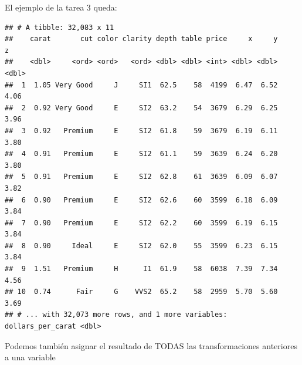 \documentclass[]{book}
\newenvironment{Shaded}{\begin{snugshade}}{\end{snugshade}}
\newcommand{\KeywordTok}[1]{\textcolor[rgb]{0.13,0.29,0.53}{\textbf{#1}}}
\newcommand{\DataTypeTok}[1]{\textcolor[rgb]{0.13,0.29,0.53}{#1}}
\newcommand{\DecValTok}[1]{\textcolor[rgb]{0.00,0.00,0.81}{#1}}
\newcommand{\StringTok}[1]{\textcolor[rgb]{0.31,0.60,0.02}{#1}}
\newcommand{\CommentTok}[1]{\textcolor[rgb]{0.56,0.35,0.01}{\textit{#1}}}
\newcommand{\OperatorTok}[1]{\textcolor[rgb]{0.81,0.36,0.00}{\textbf{#1}}}
\newcommand{\NormalTok}[1]{#1}
\theoremstyle{definition}
\theoremstyle{definition}
\theoremstyle{definition}
\theoremstyle{remark}
\begin{document}
El ejemplo de la tarea 3 queda:

\begin{Shaded}
\end{Shaded}

\begin{verbatim}
## # A tibble: 32,083 x 11
##    carat       cut color clarity depth table price     x     y     z
##    <dbl>     <ord> <ord>   <ord> <dbl> <dbl> <int> <dbl> <dbl> <dbl>
##  1  1.05 Very Good     J     SI1  62.5    58  4199  6.47  6.52  4.06
##  2  0.92 Very Good     E     SI2  63.2    54  3679  6.29  6.25  3.96
##  3  0.92   Premium     E     SI2  61.8    59  3679  6.19  6.11  3.80
##  4  0.91   Premium     E     SI2  61.1    59  3639  6.24  6.20  3.80
##  5  0.91   Premium     E     SI2  62.8    61  3639  6.09  6.07  3.82
##  6  0.90   Premium     E     SI2  62.6    60  3599  6.18  6.09  3.84
##  7  0.90   Premium     E     SI2  62.2    60  3599  6.19  6.15  3.84
##  8  0.90     Ideal     E     SI2  62.0    55  3599  6.23  6.15  3.84
##  9  1.51   Premium     H      I1  61.9    58  6038  7.39  7.34  4.56
## 10  0.74      Fair     G    VVS2  65.2    58  2959  5.70  5.60  3.69
## # ... with 32,073 more rows, and 1 more variables: dollars_per_carat <dbl>
\end{verbatim}

Podemos también asignar el resultado de TODAS las transformaciones
anteriores a una variable

\begin{Shaded}
\end{Shaded}
\end{document}
